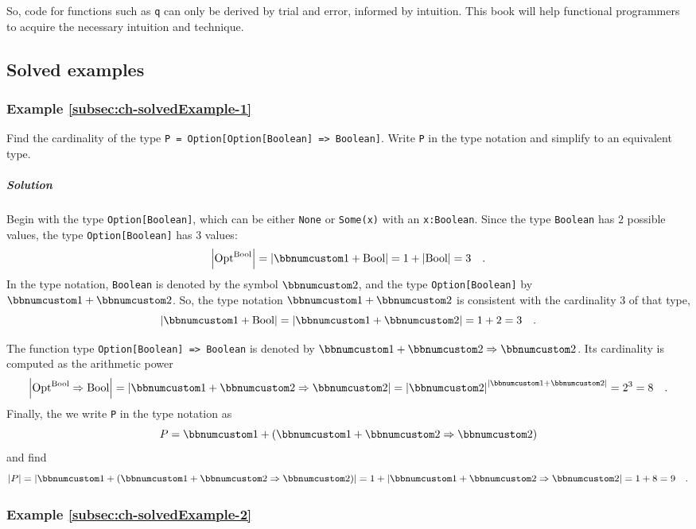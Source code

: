 So, code for functions such as \lstinline!q! can only be derived
by trial and error, informed by intuition. This book will help functional
programmers to acquire the necessary intuition and technique.

\subsection{Solved examples}

\subsubsection{Example \label{subsec:ch-solvedExample-1}\ref{subsec:ch-solvedExample-1}}

Find the cardinality of the type \lstinline!P = Option[Option[Boolean] => Boolean]!.
Write \lstinline!P! in the type notation and simplify to an equivalent
type.

\subparagraph{Solution}

Begin with the type \lstinline!Option[Boolean]!, which can be either
\lstinline!None! or \lstinline!Some(x)! with an \lstinline!x:Boolean!.
Since the type \lstinline!Boolean! has $2$ possible values, the
type \lstinline!Option[Boolean]! has $3$ values:
\[
\left|\text{Opt}^{\text{Bool}}\right|=\left|\bbnum 1+\text{Bool}\right|=1+\left|\text{Bool}\right|=3\quad.
\]
In the type notation, \lstinline!Boolean! is denoted by the symbol
$\bbnum 2$, and the type \lstinline!Option[Boolean]! by $\bbnum 1+\bbnum 2$.
So, the type notation $\bbnum 1+\bbnum 2$ is consistent with the
cardinality $3$ of that type,
\[
\left|\bbnum 1+\text{Bool}\right|=\left|\bbnum 1+\bbnum 2\right|=1+2=3\quad.
\]

The function type \lstinline!Option[Boolean] => Boolean! is denoted
by $\bbnum 1+\bbnum 2\Rightarrow\bbnum 2$. Its cardinality is computed
as the arithmetic power 
\[
\left|\text{Opt}^{\text{Bool}}\Rightarrow\text{Bool}\right|=\left|\bbnum 1+\bbnum 2\Rightarrow\bbnum 2\right|=\left|\bbnum 2\right|^{\left|\bbnum 1+\bbnum 2\right|}=2^{3}=8\quad.
\]
Finally, the we write \lstinline!P! in the type notation as 
\[
P=\bbnum 1+\left(\bbnum 1+\bbnum 2\Rightarrow\bbnum 2\right)
\]
and find 
\[
\left|P\right|=\left|\bbnum 1+\left(\bbnum 1+\bbnum 2\Rightarrow\bbnum 2\right)\right|=1+\left|\bbnum 1+\bbnum 2\Rightarrow\bbnum 2\right|=1+8=9\quad.
\]


\subsubsection{Example \label{subsec:ch-solvedExample-2}\ref{subsec:ch-solvedExample-2}}

